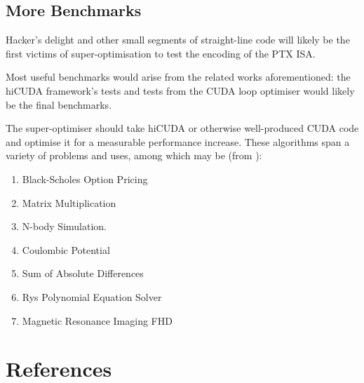 \documentclass[letterpaper,twocolumn,10pt]{article}
\begin{document}
\subsection{More Benchmarks}

Hacker's delight and other small segments of
straight-line code will likely be the first
victims of super-optimisation to test the
encoding of the PTX ISA.

Most useful benchmarks would arise from the related works aforementioned:
the hiCUDA \cite{hicuda} framework's tests and tests
from the CUDA loop optimiser \cite{CUDASynth} would likely
be the final benchmarks.

The super-optimiser should take hiCUDA or otherwise
well-produced CUDA code and optimise it for
a measurable performance increase.
These algorithms span a variety of problems and uses,
among which may be (from \cite{hicuda}):
\begin{enumerate}
    \item Black-Scholes Option Pricing
    \item Matrix Multiplication
    \item N-body Simulation.
    \item Coulombic Potential
    \item Sum of Absolute Differences
    \item Rys Polynomial Equation Solver
    \item Magnetic Resonance Imaging FHD
\end{enumerate}

\section{References}


\end{document}
